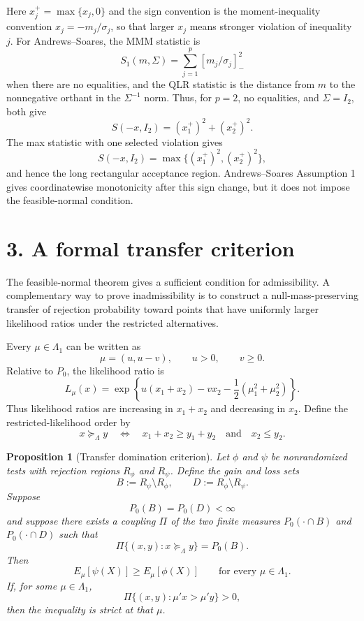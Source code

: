 \documentclass[12pt]{article}
\newtheorem{proposition}{Proposition}
\theoremstyle{remark}
\begin{document}
Here $x_j^+=\max\{x_j,0\}$ and the sign convention is the moment-inequality convention $x_j=-m_j/\sigma_j$, so that larger $x_j$ means stronger violation of inequality $j$. For Andrews--Soares, the MMM statistic is
\[
S_1(m,\Sigma)=\sum_{j=1}^p [m_j/\sigma_j]_-^2
\]
when there are no equalities, and the QLR statistic is the distance from $m$ to the nonnegative orthant in the $\Sigma^{-1}$ norm. Thus, for $p=2$, no equalities, and $\Sigma=I_2$, both give
\[
S(-x,I_2)=(x_1^+)^2+(x_2^+)^2.
\]
The max statistic with one selected violation gives
\[
S(-x,I_2)=\max\{(x_1^+)^2,(x_2^+)^2\},
\]
and hence the long rectangular acceptance region. Andrews--Soares Assumption 1 gives coordinatewise monotonicity after this sign change, but it does not impose the feasible-normal condition.

\section*{3. A formal transfer criterion}

The feasible-normal theorem gives a sufficient condition for admissibility. A complementary way to prove inadmissibility is to construct a null-mass-preserving transfer of rejection probability toward points that have uniformly larger likelihood ratios under the restricted alternatives.

Every $\mu\in\Lambda_1$ can be written as
\[
\mu=(u,u-v),
\qquad u>0,
\qquad v\ge0.
\]
Relative to $P_0$, the likelihood ratio is
\[
L_\mu(x)
=\exp\left\{u(x_1+x_2)-v x_2-\frac12(\mu_1^2+\mu_2^2)\right\}.
\]
Thus likelihood ratios are increasing in $x_1+x_2$ and decreasing in $x_2$. Define the restricted-likelihood order by
\[
x\succeq_\Lambda y
\quad\Longleftrightarrow\quad
x_1+x_2\ge y_1+y_2
\quad\text{and}\quad
x_2\le y_2.
\]

\begin{proposition}[Transfer domination criterion]\label{prop:transfer}
Let $\phi$ and $\psi$ be nonrandomized tests with rejection regions $R_\phi$ and $R_\psi$. Define the gain and loss sets
\[
B:=R_\psi\setminus R_\phi,
\qquad
D:=R_\phi\setminus R_\psi.
\]
Suppose
\[
P_0(B)=P_0(D)<\infty
\]
and suppose there exists a coupling $\Pi$ of the two finite measures $P_0(\cdot\cap B)$ and $P_0(\cdot\cap D)$ such that
\[
\Pi\{(x,y):x\succeq_\Lambda y\}=P_0(B).
\]
Then
\[
E_\mu[\psi(X)]\ge E_\mu[\phi(X)]
\qquad\text{for every }\mu\in\Lambda_1.
\]
If, for some $\mu\in\Lambda_1$,
\[
\Pi\{(x,y):\mu'x>\mu'y\}>0,
\]
then the inequality is strict at that $\mu$.
\end{proposition}
\end{document}
